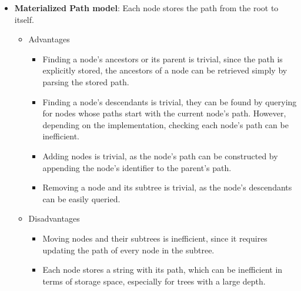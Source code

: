 \begin{itemize}[nolistsep]
\begin{itemize}
	      \end{itemize}
	\item \textbf{Materialized Path model}: Each node stores the path from the root to itself.
	      \begin{itemize}
		      \item Advantages
		            \begin{itemize}
			            \item Finding a node’s ancestors or its parent is trivial, since the path is explicitly stored,
			                  the ancestors of a node can be retrieved simply by parsing the stored path.
			            \item Finding a node’s descendants is trivial, they can be found by
			                  querying for nodes whose paths start with the current node's path.
                        However, depending on the implementation, checking each node's path can be inefficient.
			            \item Adding nodes is trivial, as the node's path can be constructed by appending
			                  the node's identifier to the parent's path.
			            \item Removing a node and its subtree is trivial, as the node's descendants can be
			                  easily queried.
		            \end{itemize}
		      \item Disadvantages
		            \begin{itemize}
			            \item Moving nodes and their subtrees is inefficient, since it requires updating
			                  the path of every node in the subtree.
			            \item Each node stores a string with its path, which can be inefficient in terms of
			                  storage space, especially for trees with a large depth.
		            \end{itemize}
	      \end{itemize}
\end{itemize}


